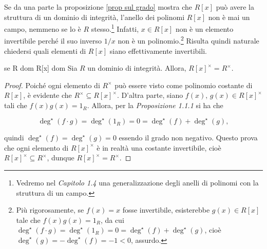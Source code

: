
\noindent Se da una parte la proposizione \ref{prop sul grado} mostra che $R[x]$ può avere la struttura di un dominio di integrità, l'anello dei polinomi $R[x]$ non è mai un campo, nemmeno se lo è $R$ stesso.\footnote{Vedremo nel \emph{Capitolo 1.4} una generalizzazione degli anelli di polinomi con la struttura di un campo.} Infatti, $x\in R[x]$ non è un elemento invertibile perché il suo inverso $1/x$ non è un polinomio.\footnote{Più rigorosamente, se $f(x)=x$ fosse invertibile, esisterebbe $g(x)\in R[x]$ tale che $f(x)g(x)=1_R$, da cui $\deg^{\star}(f\cdot g)=\deg^{\star}(1_R)=0=\deg^{\star}(f)+\deg^{\star}(g)$, cioè $\deg^{\star}(g)=-\deg^{\star}(f)=-1<0$, assurdo.} Risulta quindi naturale chiedersi quali elementi di $R[x]$ siano effettivamente invertibili.


\begin{prop}[]{se R dom R[x] dom}
Sia $R$ un dominio di integrità. Allora, $R[x]^{\times}=R^{\times}$.
\end{prop}
\vspace{-4mm}
\begin{proof}
Poiché ogni elemento di $R^{\times}$ può essere visto come polinomio costante di~$R[x]$, è evidente che 
$R^{\times}\subseteq R[x]^{\times}$. D'altra parte, siano $f(x),\,g(x)\in R[x]^{\times}$ tali che 
$f(x)g(x)=1_R$. Allora, per la \emph{Proposizione 1.1.1} si ha che 

\[\deg^{\star}(f\cdot g)=\deg^{\star}(1_R)=0=\deg^{\star}(f)+\deg^{\star}(g),\] 

\noindent quindi $\deg^{\star}(f)=\deg^{\star}(g)=0$ essendo il grado non negativo. Questo prova che 
ogni elemento di $R[x]^{\times}$ è in realtà una costante invertibile, cioè 
$R[x]^{\times}\subseteq R^{\times}$, dunque $R[x]^{\times}=R^{\times}$.
\end{proof}



